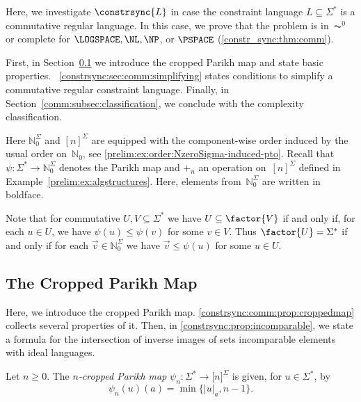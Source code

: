 
Here, we investigate $\constrsync{L}$ in case the constraint
language $L \subseteq \Sigma^*$ is a commutative regular language.
In this case, we prove that the problem
is in~$\AC^0$
or complete for $\LOGSPACE, \NL, \NP$, or $\PSPACE$ (\cref{constr_sync:thm:comm}).

First, in Section~\ref{constr_sync:sec:cropped-Parikh-map} we  introduce the cropped Parikh map
and state basic properties. \SEC~\ref{constrsync:sec:comm:simplifying} 
states conditions to simplify a commutative regular constraint language.
Finally, in Section~\ref{comm:subsec:classification}, we conclude  with the complexity classification.

Here $\mathbb N_0^{\Sigma}$ and $[n]^{\Sigma}$ are equipped with the component-wise order
induced by the usual order on~$\mathbb N_0$, see \cref{prelim:ex:order:NzeroSigma-induced-pto}.
Recall that $\psi \colon \Sigma^* \to \mathbb N_0^{\Sigma}$
denotes the Parikh map and $+_n$ an operation on~$[n]^{\Sigma}$
defined in Example~\ref{prelim:ex:algstructures}. Here, elements from~$\mathbb N_0^{\Sigma}$
are written in boldface.

\begin{remark}
	Note that for commutative $U,V \subseteq \Sigma^*$
	we have $U \subseteq \factor{V}$
	if and only if, for each $u \in U$,
	we have $\psi(u) \le \psi(v)$ for some $v \in V$.
	Thus $\factor{U} = \Sigma^*$
	if and only if for each $\vec{v} \in \mathbb N_0^{\Sigma}$
	we have $\vec{v} \le \psi(u)$ for some $u \in U$.
\end{remark}

\subsection{The Cropped Parikh Map}
\label{constr_sync:sec:cropped-Parikh-map}

 \label{def:n-cropped-Parikh-map}
Here, we introduce the cropped Parikh map.
\cref{constrsync:comm:prop:croppedmap} collects several properties of it.
Then, in \cref{constrsync:prop:incomparable}, we state
a formula for the intersection of inverse images of sets incomparable 
elements with ideal languages.

Let $n \ge 0$. The \emph{$n$-cropped Parikh map} $\psi_n \colon \Sigma^* \to \mathbb [n]^{\Sigma}$ is given, 
for $u \in \Sigma^*$, by 
\[ 
\psi_{n}(u)(a) = \min\{ |u|_a, n-1 \}.
\]

